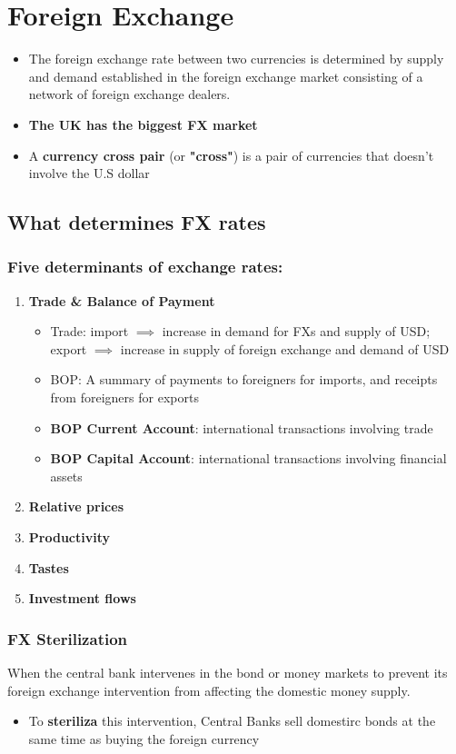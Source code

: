 \documentclass{article}
\theoremstyle{definition}
\theoremstyle{thrm}
\theoremstyle{lma}
\theoremstyle{ppst}
\theoremstyle{crlr}
\begin{document}
\section{Foreign Exchange}
\begin{itemize}
	\item The foreign exchange rate between two currencies is determined by supply and demand established in the foreign exchange market consisting of a network of foreign exchange dealers.
	\item \textbf{The UK has the biggest FX market}
	\item A \textbf{currency cross pair} (or \textbf{"cross"}) is a pair of currencies that doesn't involve the U.S dollar
\end{itemize}
\subsection{What determines FX rates}
\subsubsection{Five determinants of exchange rates:}
\begin{enumerate}
	\item \textbf{Trade \& Balance of Payment}
	\begin{itemize}
		\item Trade: import $\implies$ increase in demand for FXs and supply of USD; export $\implies$ increase in supply of foreign exchange and demand of USD
		\item BOP: A summary of payments to foreigners for imports, and receipts from foreigners for exports

		\item \textbf{BOP Current Account}: international transactions involving trade
		\item \textbf{BOP Capital Account}: international transactions involving financial assets
	\end{itemize}
	\item \textbf{Relative prices}
	\item \textbf{Productivity}
	\item \textbf{Tastes}
	\item \textbf{Investment flows}
\end{enumerate}
\subsubsection{FX Sterilization}
When the central bank intervenes in the bond or money markets to prevent its foreign exchange intervention from affecting the domestic money supply.
\begin{itemize}
	\item To \textbf{steriliza} this intervention, Central Banks sell domestirc bonds at the same time as buying the foreign currency
\end{itemize}
\end{document}

